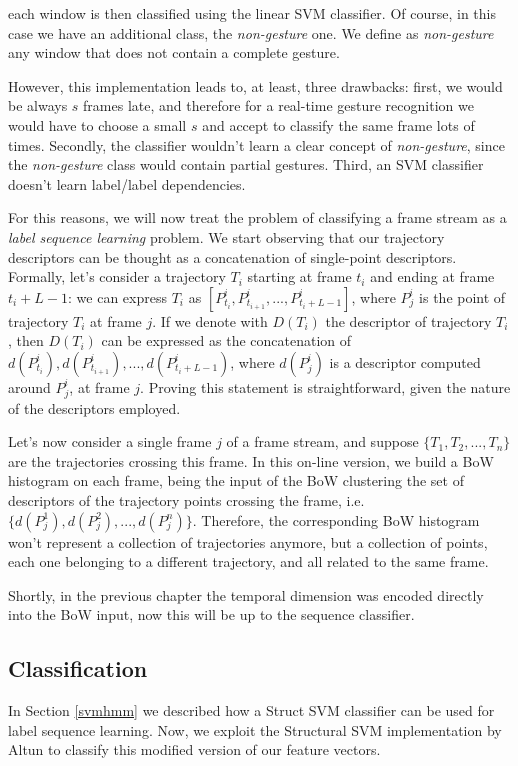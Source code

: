 each window is then classified using the linear SVM classifier. Of course, in this case we have an additional class, the \textit{non-gesture} one. We define as \textit{non-gesture} any window that does not contain a complete gesture.

However, this implementation leads to, at least, three drawbacks: first, we would be always $s$ frames late, and therefore for a real-time gesture recognition we would have to choose a small $s$ and accept to classify the same frame lots of times. Secondly, the classifier wouldn't learn a clear concept of \textit{non-gesture}, since the \textit{non-gesture} class would contain partial gestures. Third, an SVM classifier doesn't learn label/label dependencies.

\medskip

For this reasons, we will now treat the problem of classifying a frame stream as a \textit{label sequence learning} problem. We start observing that our trajectory descriptors can be thought as a concatenation of single-point descriptors. Formally, let's consider a trajectory $T_i$ starting at frame $t_i$ and ending at frame $t_i+L-1$: we can express $T_i$ as $\left[ P_{t_i}^i, P_{t_{i+1}}^i, ..., P_{t_i+L-1}^i \right]$, where $P_{j}^i$ is the point of trajectory $T_i$ at frame $j$.  If we denote with $D(T_i)$ the descriptor of trajectory $T_i$, then $D(T_i)$ can be expressed as the concatenation of $d(P_{t_i}^i), d(P_{t_{i+1}}^i), ..., d( P_{t_i+L-1}^i)$, where $d(P_{j}^i)$ is a descriptor computed around $P_j^i$, at frame $j$. Proving this statement is straightforward, given the nature of the descriptors employed.

Let's now consider a single frame $j$ of a frame stream, and suppose $ \{ T_1, T_2, ..., T_n\}$ are the trajectories crossing this frame. In this on-line version, we build a BoW histogram on each frame, being the input of the BoW clustering the set of descriptors of the trajectory points crossing the frame, i.e. $\{ d(P_{j}^1),  d(P_{j}^2), ...,  d(P_{j}^n) \}$.  Therefore, the corresponding BoW histogram won't represent a collection of trajectories anymore, but a collection of points, each one belonging to a different trajectory, and all related to the same frame.

Shortly, in the previous chapter the temporal dimension was encoded directly into the BoW input, now this will be up to the sequence classifier.


\subsection{Classification}
 In Section \ref{svmhmm} we described how a Struct SVM classifier can be used for label sequence learning. Now, we exploit the Structural SVM implementation by Altun \etal \cite{altun2003hidden} to classify this modified version of our feature vectors.

